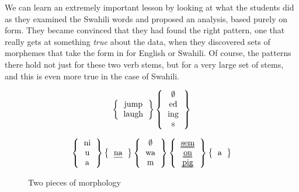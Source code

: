 \documentclass[output=paper,colorlinks,citecolor=brown]{langscibook}
\begin{document}
We can learn an extremely important lesson by looking at what the students did as they examined the Swahili words and proposed an analysis, based purely on form. They became convinced that they had found the right pattern, one that really gets at something \textit{true} about the data,  when they discovered sets of morphemes that take the form in  for English or Swahili. Of course, the patterns there hold not just for these two verb stems, but for a very large set of stems, and this is even more true in the case of Swahili.

\begin{figure}
  \[ \left\{ \begin{tabular}{c} jump \\ laugh  \end{tabular} \right\}  \left\{ \begin{tabular}{c} $\emptyset$ \\ed\\ing\\s \end{tabular}  \right\}
\]

 \[ \left\{ 
\begin{tabular}{c} 
ni \\ u \\ a 
\end{tabular} 
\right\}
\left\{ 
\begin{tabular}{c}
\uline{na} 
\end{tabular}  
\right\}  
\left\{ 
\begin{tabular}{c} 
$\emptyset$ \\ wa  \\ m 
\end{tabular} 
\right\} 
\left\{ 
\begin{tabular}{c} 
\uuline{sem} \\ \uuline{on} \\ \uuline{pig}  
\end{tabular}  
\right\}
\left\{ 
\begin{tabular}{c}
a 
\end{tabular}  
\right\} 
\]
\caption{Two pieces of morphology}
\label{morphology}
\end{figure}
 


 
\end{document}
